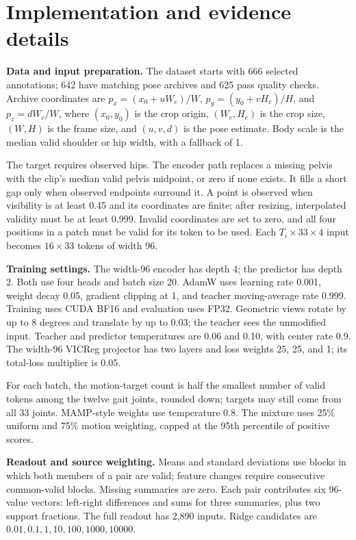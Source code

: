 \documentclass{article}
\begin{document}
\clearpage


\clearpage
\appendix
\section{Implementation and evidence
details}\label{implementation-and-evidence-details}

\textbf{Data and input preparation.} The dataset starts with 666
selected annotations; 642 have matching pose archives and 625 pass
quality checks. Archive coordinates are \(p_x=(x_0+uW_c)/W\),
\(p_y=(y_0+vH_c)/H\), and \(p_z=dW_c/W\), where \((x_0,y_0)\) is the
crop origin, \((W_c,H_c)\) is the crop size, \((W,H)\) is the frame
size, and \((u,v,d)\) is the pose estimate. Body scale is the median
valid shoulder or hip width, with a fallback of 1.

The target requires observed hips. The encoder path replaces a missing
pelvis with the clip's median valid pelvis midpoint, or zero if none
exists. It fills a short gap only when observed endpoints surround it. A
point is observed when visibility is at least 0.45 and its coordinates
are finite; after resizing, interpolated validity must be at least
0.999. Invalid coordinates are set to zero, and all four positions in a
patch must be valid for its token to be used. Each
\(T_i\times33\times4\) input becomes \(16\times33\) tokens of width 96.

\textbf{Training settings.} The width-96 encoder has depth 4; the
predictor has depth 2. Both use four heads and batch size 20. AdamW uses
learning rate 0.001, weight decay 0.05, gradient clipping at 1, and
teacher moving-average rate 0.999. Training uses CUDA BF16 and
evaluation uses FP32. Geometric views rotate by up to 8 degrees and
translate by up to 0.03; the teacher sees the unmodified input. Teacher
and predictor temperatures are 0.06 and 0.10, with center rate 0.9. The
width-96 VICReg projector has two layers and loss weights 25, 25, and 1;
its total-loss multiplier is 0.05.

For each batch, the motion-target count is half the smallest number of
valid tokens among the twelve gait joints, rounded down; targets may
still come from all 33 joints. MAMP-style weights use temperature 0.8.
The mixture uses 25\% uniform and 75\% motion weighting, capped at the
95th percentile of positive scores.

\textbf{Readout and source weighting.} Means and standard deviations use
blocks in which both members of a pair are valid; feature changes
require consecutive common-valid blocks. Missing summaries are zero.
Each pair contributes six 96-value vectors: left-right differences and
sums for three summaries, plus two support fractions. The full readout
has 2,890 inputs. Ridge candidates are \(0.01,0.1,1,10,100,1000,10000\).
\end{document}
